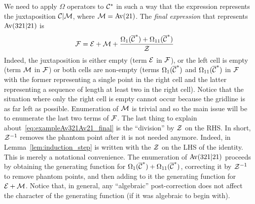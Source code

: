 \documentclass[12pt, a4paper, twoside]{report}
\begin{document}
We need to apply $\Omega$ operators to $\mathcal{C}^*$ in such a way that the expression represents the juxtaposition $\mathcal{C}|\mathcal{M}$, where $\mathcal{M} = \mathrm{Av}(21)$. The \emph{final expression} that represents $\mathrm{Av}(321|21)$ is 
\begin{align}
  \mathcal{F} &= \mathcal{E} + \mathcal{M} + \frac{\Omega_1(\overline{\mathcal{C}}^*) + \Omega_{11}(\overline{\mathcal{C}}^*)}{\mathcal{Z}}
      \label{eq:exampleAv321Av21_final}
\end{align}
Indeed, the juxtaposition is either empty (term $\mathcal{E}$ in $\mathcal{F}$), or the left cell is empty (term $\mathcal{M}$ in $\mathcal{F}$) or both cells are non-empty (terms $\Omega_1(\overline{\mathcal{C}}^*)$ and $\Omega_{11}(\overline{\mathcal{C}}^*)$ in $\mathcal{F}$ with the former representing a single point in the right cell and the latter representing a sequence of length at least two in the right cell). Notice that the situation where only the right cell is empty cannot occur because the gridline is as far left as possible. Enumeration of $\mathcal{M}$ is trivial and so the main issue will be to enumerate the last two terms of $\mathcal{F}$. The last thing to explain about~\eqref{eq:exampleAv321Av21_final} is the ``division'' by $\mathcal{Z}$ on the RHS. In short, $\mathcal{Z}^{-1}$ removes the phantom point after it is not needed anymore. Indeed, in Lemma~\ref{lem:induction_step} is written with the $\mathcal{Z}$ on the LHS of the identity. This is merely a notational convenience. The enumeration of $\mathrm{Av}(321|21)$ proceeds by obtaining the generating function for $\Omega_1(\overline{\mathcal{C}}^*) + \Omega_{11}(\overline{\mathcal{C}}^*)$, correcting it by $\mathcal{Z}^{-1}$ to remove phantom points, and then adding to it the generating function for $\mathcal{E}+\mathcal{M}$. Notice that, in general, any ``algebraic'' post-correction does not affect the character of the generating function (if it was algebraic to begin with). 
\end{document}
